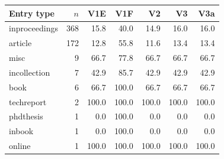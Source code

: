\begin{tabular}{lrrrrrr}
\toprule
Entry type & $n$ & V1E & V1F & V2 & V3 & V3a \\
\midrule
inproceedings & 368 & 15.8 & 40.0 & 14.9 & 16.0 & 16.0 \\
article & 172 & 12.8 & 55.8 & 11.6 & 13.4 & 13.4 \\
misc & 9 & 66.7 & 77.8 & 66.7 & 66.7 & 66.7 \\
incollection & 7 & 42.9 & 85.7 & 42.9 & 42.9 & 42.9 \\
book & 6 & 66.7 & 100.0 & 66.7 & 66.7 & 66.7 \\
techreport & 2 & 100.0 & 100.0 & 100.0 & 100.0 & 100.0 \\
phdthesis & 1 & 0.0 & 100.0 & 0.0 & 0.0 & 0.0 \\
inbook & 1 & 0.0 & 100.0 & 0.0 & 0.0 & 0.0 \\
online & 1 & 100.0 & 100.0 & 100.0 & 100.0 & 100.0 \\
\bottomrule
\end{tabular}
